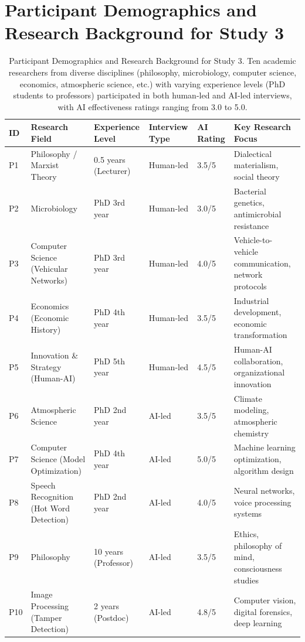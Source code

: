 \documentclass[sigchi,nonacm,manuscript]{acmart}
\begin{document}
\section{Participant Demographics and Research Background for Study 3}
\label{sec:participant_details_study_3}
\begin{table}[h]
    \caption{Participant Demographics and Research Background for Study 3. Ten academic researchers from diverse disciplines (philosophy, microbiology, computer science, economics, atmospheric science, etc.) with varying experience levels (PhD students to professors) participated in both human-led and AI-led interviews, with AI effectiveness ratings ranging from 3.0 to 5.0.}
    \label{tab:participant_details}
    \small
    \begin{tabular}{@{}p{0.6cm}p{2.8cm}p{2.2cm}p{1.8cm}p{1.2cm}p{4.8cm}@{}}
    \toprule
    \textbf{ID} & \textbf{Research Field} & \textbf{Experience Level} & \textbf{Interview Type} & \textbf{AI Rating} & \textbf{Key Research Focus} \\
    \midrule
    P1 & Philosophy / Marxist Theory & 0.5 years (Lecturer) & Human-led & 3.5/5 & Dialectical materialism, social theory \\
    P2 & Microbiology & PhD 3rd year & Human-led & 3.0/5 & Bacterial genetics, antimicrobial resistance \\
    P3 & Computer Science (Vehicular Networks) & PhD 3rd year & Human-led & 4.0/5 & Vehicle-to-vehicle communication, network protocols \\
    P4 & Economics (Economic History) & PhD 4th year & Human-led & 3.5/5 & Industrial development, economic transformation \\
    P5 & Innovation \& Strategy (Human-AI) & PhD 5th year & Human-led & 4.5/5 & Human-AI collaboration, organizational innovation \\
    P6 & Atmospheric Science & PhD 2nd year & AI-led & 3.5/5 & Climate modeling, atmospheric chemistry \\
    P7 & Computer Science (Model Optimization) & PhD 4th year & AI-led & 5.0/5 & Machine learning optimization, algorithm design \\
    P8 & Speech Recognition (Hot Word Detection) & PhD 2nd year & AI-led & 4.0/5 & Neural networks, voice processing systems \\
    P9 & Philosophy & 10 years (Professor) & AI-led & 3.5/5 & Ethics, philosophy of mind, consciousness studies \\
    P10 & Image Processing (Tamper Detection) & 2 years (Postdoc) & AI-led & 4.8/5 & Computer vision, digital forensics, deep learning \\
    \bottomrule
    \end{tabular}
\end{table}
\newpage
\end{document}
